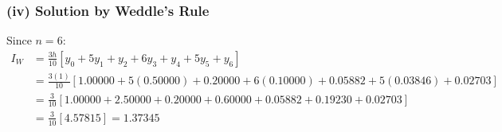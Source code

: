 \subsubsection*{(iv) Solution by Weddle's Rule}
Since $n = 6$:
\begin{align}
    I_W &= \frac{3h}{10} \left[ y_0 + 5y_1 + y_2 + 6y_3 + y_4 + 5y_5 + y_6 \right] \nonumber \\
    &= \frac{3(1)}{10} \left[ 1.00000 + 5(0.50000) + 0.20000 + 6(0.10000) + 0.05882 + 5(0.03846) + 0.02703 \right] \nonumber \\
    &= \frac{3}{10} \left[ 1.00000 + 2.50000 + 0.20000 + 0.60000 + 0.05882 + 0.19230 + 0.02703 \right] \nonumber \\
    &= \frac{3}{10} [4.57815] = \boxed{1.37345}
\end{align}

